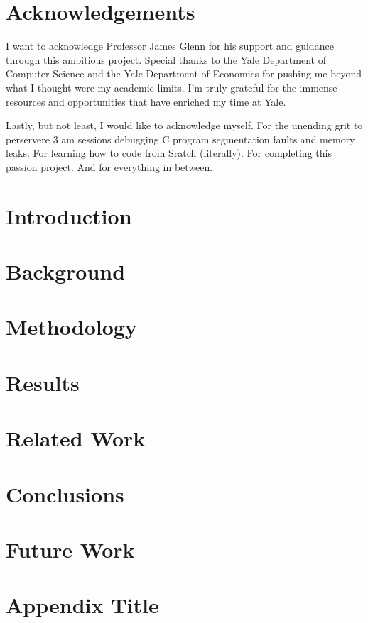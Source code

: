\documentclass[12pt,twoside]{report}
\begin{document}


\chapter*{Acknowledgements}
I want to acknowledge Professor James Glenn for his support and guidance through this ambitious project. Special thanks to the Yale Department of Computer Science and the Yale Department of Economics for pushing me beyond what I thought were my academic limits.
I'm truly grateful for the immense resources and opportunities that have enriched my time at Yale.

Lastly, but not least, I would like to acknowledge myself. For the unending grit to perservere 3 am sessions debugging C program segmentation faults and memory leaks. For learning how to code from \href{https://scratch.mit.edu/}{Sratch} (literally). For completing this passion project.
And for everything in between.
{
  \hypersetup{linkcolor=black}
  \tableofcontents
}

\clearpage




\chapter{Introduction}


\chapter{Background} \label{ch:background}


\chapter{Methodology} \label{ch:methodology}



\chapter{Results} \label{ch:results}


\chapter{Related Work} \label{ch:relatedwork}


\chapter{Conclusions} \label{ch:conclusion}


\chapter{Future Work} \label{ch:futurework}



\printbibliography
\appendix
\chapter{Appendix Title} \label{ch:appendices}
 
\end{document}
